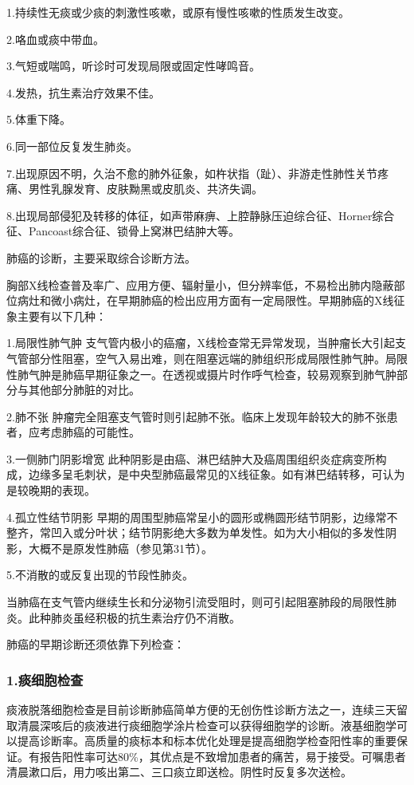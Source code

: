 1.持续性无痰或少痰的刺激性咳嗽，或原有慢性咳嗽的性质发生改变。

2.咯血或痰中带血。

3.气短或喘鸣，听诊时可发现局限或固定性哮鸣音。

4.发热，抗生素治疗效果不佳。

5.体重下降。

6.同一部位反复发生肺炎。

7.出现原因不明，久治不愈的肺外征象，如杵状指（趾）、非游走性肺性关节疼痛、男性乳腺发育、皮肤黝黑或皮肌炎、共济失调。

8.出现局部侵犯及转移的体征，如声带麻痹、上腔静脉压迫综合征、Horner综合征、Pancoast综合征、锁骨上窝淋巴结肿大等。

肺癌的诊断，主要采取综合诊断方法。

胸部X线检查普及率广、应用方便、辐射量小，但分辨率低，不易检出肺内隐蔽部位病灶和微小病灶，在早期肺癌的检出应用方面有一定局限性。早期肺癌的X线征象主要有以下几种：

1.局限性肺气肿
支气管内极小的癌瘤，X线检查常无异常发现，当肿瘤长大引起支气管部分性阻塞，空气入易出难，则在阻塞远端的肺组织形成局限性肺气肿。局限性肺气肿是肺癌早期征象之一。在透视或摄片时作呼气检查，较易观察到肺气肿部分与其他部分肺脏的对比。

2.肺不张
肿瘤完全阻塞支气管时则引起肺不张。临床上发现年龄较大的肺不张患者，应考虑肺癌的可能性。

3.一侧肺门阴影增宽
此种阴影是由癌、淋巴结肿大及癌周围组织炎症病变所构成，边缘多呈毛刺状，是中央型肺癌最常见的X线征象。如有淋巴结转移，可认为是较晚期的表现。

4.孤立性结节阴影
早期的周围型肺癌常呈小的圆形或椭圆形结节阴影，边缘常不整齐，常凹入或分叶状；结节阴影绝大多数为单发性。如为大小相似的多发性阴影，大概不是原发性肺癌（参见第31节）。

5.不消散的或反复出现的节段性肺炎。

当肺癌在支气管内继续生长和分泌物引流受阻时，则可引起阻塞肺段的局限性肺炎。此种肺炎虽经积极的抗生素治疗仍不消散。

肺癌的早期诊断还须依靠下列检查：

\subsubsection{1.痰细胞检查}

痰液脱落细胞检查是目前诊断肺癌简单方便的无创伤性诊断方法之一，连续三天留取清晨深咳后的痰液进行痰细胞学涂片检查可以获得细胞学的诊断。液基细胞学可以提高诊断率。高质量的痰标本和标本优化处理是提高细胞学检查阳性率的重要保证。有报告阳性率可达80\%，其优点是不致增加患者的痛苦，易于接受。可嘱患者清晨漱口后，用力咳出第二、三口痰立即送检。阴性时反复多次送检。

